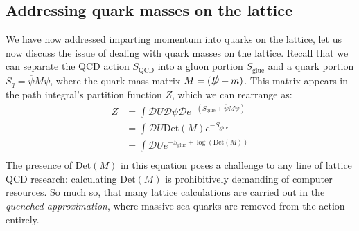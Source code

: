  \subsection{Addressing quark masses on the lattice}\label{sec:quark_mass_on_lattice}
 We have now addressed imparting momentum into quarks on the lattice, let us now discuss the issue of dealing with quark masses on the lattice.  Recall that we can separate the QCD action $S_\mathrm{QCD}$ into a gluon portion $S_\mathrm{glue}$ and a quark portion $S_q =\overline{\psi}M\psi$, where the quark mass matrix $M =( \slashed{D}+m)$.  This matrix appears in the path integral's partition function $Z$, which we can rearrange as:
 \begin{equation}\label{eq:partition_mass}
 \begin{split}
      Z &= \int \mathcal{D}U\mathcal{D}\psi \mathcal{D}e^{-(S_\mathrm{glue}+\overline{\psi}M\psi)}  \\
      &= \int\mathcal{D}U \mathrm{Det}(M) e^{-S_\mathrm{glue}} \\
      &= \int\mathcal{D}U e^{-S_\mathrm{glue}+\log(\mathrm{Det}(M))} \\
 \end{split}
 \end{equation}
The presence of $\mathrm{Det}(M)$ in this equation poses a challenge to any line of lattice QCD research: calculating $\mathrm{Det}(M)$ is prohibitively demanding of computer resources.  So much so, that many lattice calculations are carried out in the \textit{quenched approximation}, where massive sea quarks are removed from the action entirely.  

